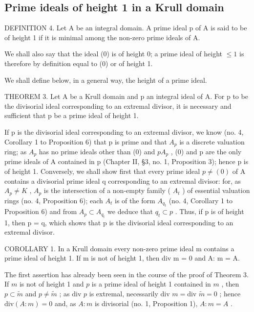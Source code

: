 \subsection{Prime ideals of height 1 in a Krull domain}

DEFINITION 4. Let A be an integral domain. A prime ideal p of A is said to be of height 1 if it is minimal among the non-zero prime ideals of A.

We shall also say that the ideal (0) is of height 0; a prime ideal of height \(\leqslant 1\) is therefore by definition equal to (0) or of height 1.

We shall define below, in a general way, the height of a prime ideal.

THEOREM 3. Let A be a Krull domain and p an integral ideal of A. For p to be the divisorial ideal corresponding to an extremal divisor, it is necessary and sufficient that p be a prime ideal of height 1.

If p is the divisorial ideal corresponding to an extremal divisor, we know (no. 4, Corollary 1 to Proposition 6) that p is prime and that \(A_{p}\) is a discrete valuation ring; as \(A_{p}\) has no prime ideals other than (0) and \(pA_{p}\) , (0) and p are the only prime ideals of A contained in p (Chapter II, §3, no. 1, Proposition 3); hence p is of height 1. Conversely, we shall show first that every prime ideal \(p \neq (0)\) of A contains a divisorial prime ideal q corresponding to an extremal divisor: for, as \(A_{p} \neq K\) , \(A_{p}\) is the intersection of a non-empty family ( \(A_{t}\) ) of essential valuation rings (no. 4, Proposition 6); each \(A_{t}\) is of the form \(A_{q_{t}}\) (no. 4, Corollary 1 to Proposition 6) and from \(A_{p} \subset A_{q_{t}}\) we deduce that \(q_{t} \subset p\) . Thus, if p is of height 1, then p = q, which shows that p is the divisorial ideal corresponding to an extremal divisor.

COROLLARY 1. In a Krull domain every non-zero prime ideal m contains a prime ideal of height 1. If m is not of height 1, then div m = 0 and A: m = A.

The first assertion has already been seen in the course of the proof of Theorem 3. If \(m\) is not of height 1 and \(p\) is a prime ideal of height 1 contained in \(m\) , then \(p \subset \tilde{m}\) and \(p \neq \tilde{m}\) ; as \(\text{div } p\) is extremal, necessarily \(\text{div } m = \text{div } \tilde{m} = 0\) ; hence \(\text{div}(A: m) = 0\) and, as \(A: m\) is divisorial (no. 1, Proposition 1), \(A: m = A\) .

